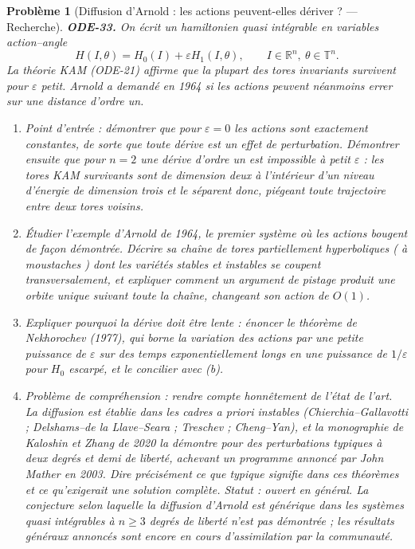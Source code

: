 \documentclass[11pt]{article}
\newtheorem{problem}{Problème}
\begin{document}
\bigskip

\begin{problem}[{Diffusion d'Arnold : les actions peuvent-elles dériver ? --- Recherche}]
\textbf{ODE-33.} On écrit un hamiltonien quasi intégrable en variables action--angle
\[ H(I, \theta) = H_0(I) + \varepsilon H_1(I, \theta), \qquad I \in \mathbb{R}^n, \ \theta \in \mathbb{T}^n . \]
La théorie KAM (ODE-21) affirme que la plupart des tores invariants survivent pour
$ \varepsilon $ petit. Arnold a demandé en 1964 si les actions peuvent néanmoins errer sur une
distance d'ordre un.
\begin{enumerate}
\item[(a)] Point d'entrée : démontrer que pour $ \varepsilon = 0 $ les actions sont exactement
constantes, de sorte que toute dérive est un effet de perturbation. Démontrer ensuite que pour
$ n = 2 $ une dérive d'ordre un est \textit{impossible} à petit $ \varepsilon $ : les tores KAM
survivants sont de dimension deux à l'intérieur d'un niveau d'énergie de dimension trois et le
séparent donc, piégeant toute trajectoire entre deux tores voisins.
\item[(b)] Étudier l'exemple d'Arnold de 1964, le premier système où les actions bougent de façon
démontrée. Décrire sa chaîne de tores partiellement hyperboliques (\og{} à moustaches \fg{}) dont les
variétés stables et instables se coupent transversalement, et expliquer comment un argument de
pistage produit une orbite unique suivant toute la chaîne, changeant son action de
$ O(1) $.
\item[(c)] Expliquer pourquoi la dérive doit être lente : énoncer le théorème de Nekhorochev (1977), qui
borne la variation des actions par une petite puissance de $ \varepsilon $ sur des temps
exponentiellement longs en une puissance de $ 1/\varepsilon $ pour $ H_0 $ escarpé, et le
concilier avec (b).
\item[(d)] Problème de compréhension : rendre compte honnêtement de l'état de l'art. La diffusion est
établie dans les cadres \textit{a priori instables} (Chierchia--Gallavotti ;
Delshams--de la Llave--Seara ; Treschev ; Cheng--Yan), et la monographie de Kaloshin et Zhang de 2020
la démontre pour des perturbations typiques à deux degrés et demi de liberté, achevant un
programme annoncé par John Mather en 2003. Dire précisément ce que \og{} typique \fg{} signifie dans ces
théorèmes et ce qu'exigerait une solution complète.
\textit{Statut : ouvert en général. La conjecture selon laquelle la diffusion d'Arnold est générique
dans les systèmes quasi intégrables à $ n \ge 3 $ degrés de liberté n'est pas démontrée ; les
résultats généraux annoncés sont encore en cours d'assimilation par la communauté.}
\end{enumerate}

\end{problem}
\end{document}

